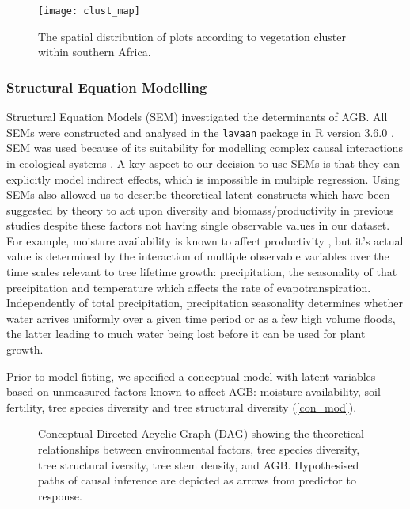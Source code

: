 \documentclass[11pt,a4paper]{article}
\begin{document}


\begin{figure}[H]
\centering
	\texttt{[image: clust\_map]}
	\caption{The spatial distribution of plots according to vegetation cluster within southern Africa.}
	\label{clust_map}
\end{figure}

\subsubsection{Structural Equation Modelling}

Structural Equation Models (SEM) investigated the determinants of AGB. All SEMs were constructed and analysed in the \verb|lavaan| package in R version 3.6.0 \citep{R2019}. SEM was used because of its suitability for modelling complex causal interactions in ecological systems \citep{Lee2007}. A key aspect to our decision to use SEMs is that they can explicitly model indirect effects, which is impossible in multiple regression. Using SEMs also allowed us to describe theoretical latent constructs which have been suggested by theory to act upon diversity and biomass/productivity in previous studies despite these factors not having single observable values in our dataset. For example, moisture availability is known to affect productivity \citep{}, but it's actual value is determined by the interaction of multiple observable variables over the time scales relevant to tree lifetime growth: precipitation, the seasonality of that precipitation and temperature which affects the rate of evapotranspiration. Independently of total precipitation, precipitation seasonality determines whether water arrives uniformly over a given time period or as a few high volume floods, the latter leading to much water being lost before it can be used for plant growth. 

Prior to model fitting, we specified a conceptual model with latent variables based on unmeasured factors known to affect AGB: moisture availability, soil fertility, tree species diversity and tree structural diversity (\autoref{con_mod}). 

\begin{figure}[H]
\centering
	
	\caption{Conceptual Directed Acyclic Graph (DAG) showing the theoretical relationships between environmental factors, tree species diversity, tree structural iversity, tree stem density, and AGB. Hypothesised paths of causal inference are depicted as arrows from predictor to response.}
	\label{con_mod}
\end{figure}
\end{document}
